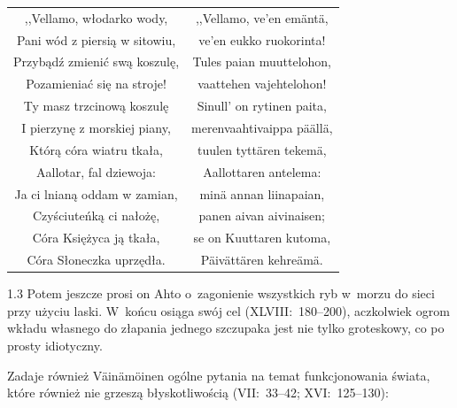 \documentclass[11pt,a4paper,twoside]{report}
\begin{document}
{\centering
\small
\begin{longtable}{c c}
,,Vellamo, włodarko wody, 		& ,,Vellamo, ve'en emäntä, \\
Pani wód z piersią w sitowiu, 		& ve'en eukko ruokorinta! \\
Przybądź zmienić swą koszulę, 		& Tules paian muuttelohon, \\
Pozamieniać się na stroje! 		& vaattehen vajehtelohon! \\
Ty masz trzcinową koszulę		& Sinull' on rytinen paita, \\
I pierzynę z morskiej piany, 		& merenvaahtivaippa päällä, \\
Którą córa wiatru tkała, 			& tuulen tyttären tekemä, \\
Aallotar, fal dziewoja: 			& Aallottaren antelema: \\
Ja ci lnianą oddam w zamian, 		& minä annan liinapaian, \\
Czyściuteńką ci nałożę, 			& panen aivan aivinaisen; \\
Córa Księżyca ją tkała, 			& se on Kuuttaren kutoma, \\
Córa Słoneczka uprzędła. 		& Päivättären kehreämä. \\
\end{longtable}
}
\begin{spacing}{1.3}
Potem jeszcze prosi on Ahto o~zagonienie wszystkich ryb w~morzu do sieci przy użyciu laski. W~końcu osiąga swój cel (XLVIII:~180--200), aczkolwiek ogrom wkładu własnego do złapania jednego szczupaka jest nie tylko groteskowy, co po prosty idiotyczny.

Zadaje również Väinämöinen ogólne pytania na temat funkcjonowania świata, które również nie grzeszą błyskotliwością (VII:~33--42; XVI:~125--130):
\end{spacing}
\end{document}
